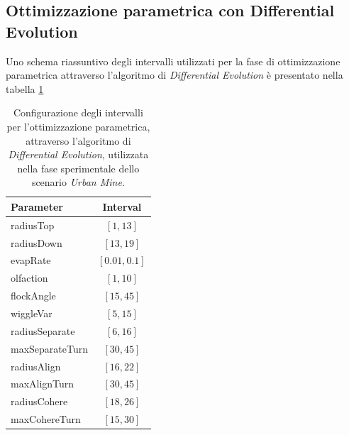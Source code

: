 \subsection{Ottimizzazione parametrica con Differential Evolution}

Uno schema riassuntivo degli intervalli utilizzati per la fase di ottimizzazione parametrica attraverso l'algoritmo di \textit{Differential Evolution} è presentato nella tabella \ref{tabella_intervalli_urbanMine}

\begin{table}[H]
    \centering
    
    \begin{tabular}{|l|c|}
    \hline
    \textbf{Parameter}              & \textbf{Interval}                 \\ \hline
    radiusTop                       & $[1,13]$                          \\ \hline
    radiusDown                      & $[13,19]$                         \\ \hline
    evapRate                        & $[0.01,0.1]$                      \\ \hline
    olfaction                       & $[1,10]$                          \\ \hline
    flockAngle                      & $[15,45]$                         \\ \hline
    wiggleVar                       & $[5,15]$                          \\ \hline
    radiusSeparate                  & $[6,16]$                          \\ \hline
    maxSeparateTurn                 & $[30,45]$                         \\ \hline
    radiusAlign                     & $[16,22]$                         \\ \hline
    maxAlignTurn                    & $[30,45]$                         \\ \hline
    radiusCohere                    & $[18,26]$                         \\ \hline
    maxCohereTurn                       & $[15,30]$                         \\ \hline
    \end{tabular}%
    
    \caption{Configurazione degli intervalli per l'ottimizzazione parametrica, attraverso l'algoritmo di \textit{Differential Evolution}, utilizzata nella fase sperimentale dello scenario \textit{Urban Mine}.}
    \label{tabella_intervalli_urbanMine}
\end{table}

